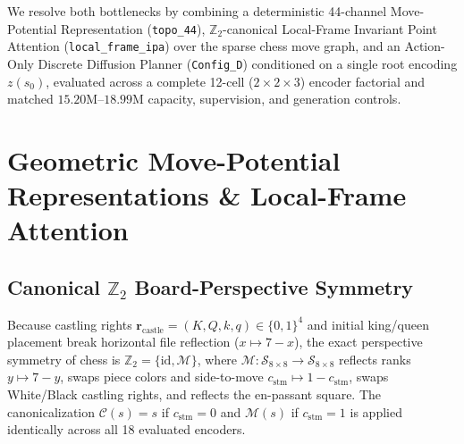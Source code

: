 \documentclass[10pt]{article}
\begin{document}
We resolve both bottlenecks by combining a deterministic 44-channel Move-Potential Representation (\texttt{topo\_44}), $\mathbb{Z}_2$-canonical Local-Frame Invariant Point Attention (\texttt{local\_frame\_ipa}) over the sparse chess move graph, and an Action-Only Discrete Diffusion Planner (\texttt{Config\_D}) conditioned on a single root encoding $z(s_0)$, evaluated across a complete 12-cell ($2 \times 2 \times 3$) encoder factorial and matched $15.20\text{M}\text{--}18.99\text{M}$ capacity, supervision, and generation controls.

\section{Geometric Move-Potential Representations \& Local-Frame Attention}

\subsection{Canonical $\mathbb{Z}_2$ Board-Perspective Symmetry}
Because castling rights $\mathbf{r}_{\text{castle}} = (K, Q, k, q) \in \{0,1\}^4$ and initial king/queen placement break horizontal file reflection ($x \mapsto 7 - x$), the exact perspective symmetry of chess is $\mathbb{Z}_2 = \{\mathrm{id}, \mathcal{M}\}$, where $\mathcal{M}: \mathcal{S}_{8\times 8} \to \mathcal{S}_{8\times 8}$ reflects ranks $y \mapsto 7 - y$, swaps piece colors and side-to-move $c_{\text{stm}} \mapsto 1 - c_{\text{stm}}$, swaps White/Black castling rights, and reflects the en-passant square. The canonicalization $\mathcal{C}(s) = s$ if $c_{\text{stm}}=0$ and $\mathcal{M}(s)$ if $c_{\text{stm}}=1$ is applied identically across all 18 evaluated encoders.
\end{document}
